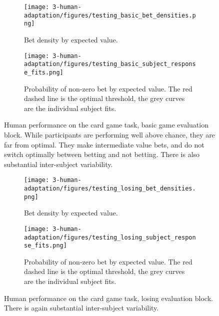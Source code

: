 \begin{figure}
\centering
\begin{subfigure}[t]{0.5\textwidth}
\texttt{[image: 3-human-adaptation/figures/testing\_basic\_bet\_densities.png]}
\caption{Bet density by expected value.}
\end{subfigure}%
\begin{subfigure}[t]{0.5\textwidth}
\texttt{[image: 3-human-adaptation/figures/testing\_basic\_subject\_response\_fits.png]}
\caption{Probability of non-zero bet by expected value. The red dashed line is the optimal threshold, the grey curves are the individual subject fits.}
\end{subfigure}%
\caption[Human performance on the card game task, basic game evaluation block.]{Human performance on the card game task, basic game evaluation block. While participants are performing well above chance, they are far from optimal. They make intermediate value bets, and do not switch optimally between betting and not betting. There is also substantial inter-subject variability.} \label{fig:human_cards_basic_results}
\end{figure}
\begin{figure}
\centering
\begin{subfigure}[t]{0.5\textwidth}
\texttt{[image: 3-human-adaptation/figures/testing\_losing\_bet\_densities.png]}
\caption{Bet density by expected value.}
\end{subfigure}%
\begin{subfigure}[t]{0.5\textwidth}
\texttt{[image: 3-human-adaptation/figures/testing\_losing\_subject\_response\_fits.png]}
\caption{Probability of non-zero bet by expected value. The red dashed line is the optimal threshold, the grey curves are the individual subject fits.}
\end{subfigure}%
\caption[Human performance on the card game task, losing evaluation block.]{Human performance on the card game task, losing evaluation block. There is again substantial inter-subject variability.} \label{fig:human_cards_losing_results}
\end{figure}


